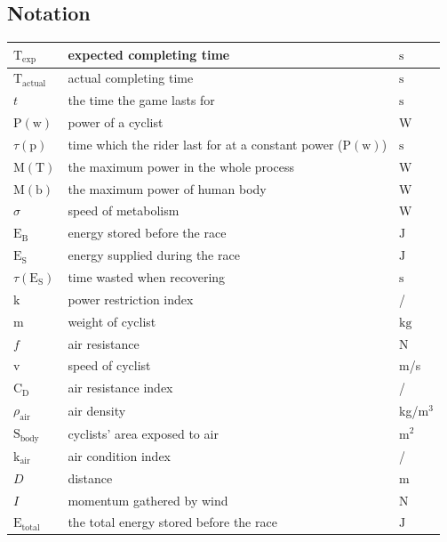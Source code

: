 \documentclass{article}
\begin{document}
	\subsection{Notation}
	\begin{tabular}{|l|l|l|}
		\hline
		$\mathrm{T}_\mathrm{exp}$&expected completing time&$\mathrm{s}$\\
		\hline
		$\mathrm{T}_\mathrm{actual}$&actual completing time&$\mathrm{s}$\\
		\hline
		$t$&the time the game lasts for&$\mathrm{s}$\\
		\hline
		$\mathrm{P}(\mathrm{w})$&power of a cyclist&W\\
		\hline
		$\tau(\mathrm{p})$&time which the rider last for at a constant power ($\mathrm{P}(\mathrm{w})$)&$\mathrm{s}$\\
		\hline
		$\mathrm{M}(\mathrm{T})$&the maximum power in the whole process&$\mathrm{W}$\\
		\hline
		$\mathrm{M}(\mathrm{b})$&the maximum power of human body&$\mathrm{W}$\\
		\hline
		$\sigma$&speed of metabolism&$\mathrm{W}$\\
		\hline
		$\mathrm{E}_\mathrm{B}$&energy stored before the race&$\mathrm{J}$\\
		\hline
		$\mathrm{E}_\mathrm{S}$&energy supplied during the race&$\mathrm{J}$\\
		\hline
		$\tau(\mathrm{E}_\mathrm{S})$&time wasted when recovering&$\mathrm{s}$\\
		\hline
		$\mathrm{k}$&power restriction index&/\\
		\hline
		$\mathrm{m}$&weight of cyclist&$\mathrm{kg}$\\
		\hline
		$f$&air resistance&$\mathrm{N}$\\
		\hline
		$\mathrm{v}$&speed of cyclist&m/s\\
		\hline
		$\mathrm{C}_\mathrm{D}$&air resistance index&/\\
		\hline
		$\rho_\mathrm{air}$&air density&kg/$\mathrm{m}^3$\\
		\hline
		$\mathrm{S}_\mathrm{body}$&cyclists' area exposed to air&$\mathrm{m}^2$\\
		\hline
		$\mathrm{k}_\mathrm{air}$&air condition index&/\\
		\hline
		$D$&distance&m\\
		\hline
		$I$&momentum gathered by wind&$\mathrm{N}$\\
		\hline
		$\mathrm{E}_\mathrm{total}$&the total energy stored before the race&$\mathrm{J}$\\
		\hline
	\end{tabular}
\end{document}
